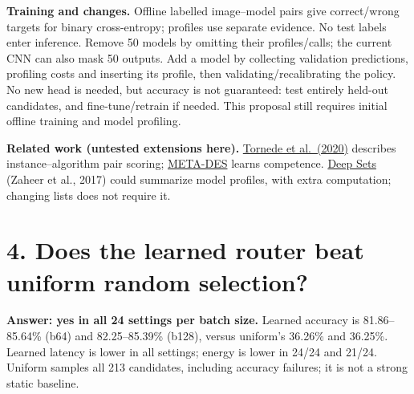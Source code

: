 \documentclass[10pt,a4paper]{article}
\begin{document}
\begin{center}
\end{center}

\textbf{Training and changes.} Offline labelled image--model pairs give correct/wrong targets for binary cross-entropy; profiles use separate evidence. No test labels enter inference. Remove 50 models by omitting their profiles/calls; the current CNN can also mask 50 outputs. Add a model by collecting validation predictions, profiling costs and inserting its profile, then validating/recalibrating the policy. No new head is needed, but accuracy is not guaranteed: test entirely held-out candidates, and fine-tune/retrain if needed. This proposal still requires initial offline training and model profiling.

\textbf{Related work (untested extensions here).} \href{https://arxiv.org/abs/2001.10741}{Tornede et al.\ (2020)} describes instance--algorithm pair scoring; \href{https://arxiv.org/abs/1810.01270}{META-DES} learns competence. \href{https://arxiv.org/abs/1703.06114}{Deep Sets} (Zaheer et al., 2017) could summarize model profiles, with extra computation; changing lists does not require it.

\section*{4. Does the learned router beat uniform random selection?}
\textbf{Answer: yes in all 24 settings per batch size.} Learned accuracy is 81.86--85.64\% (b64) and 82.25--85.39\% (b128), versus uniform's 36.26\% and 36.25\%. Learned latency is lower in all settings; energy is lower in 24/24 and 21/24. Uniform samples all 213 candidates, including accuracy failures; it is not a strong static baseline.
\end{document}
